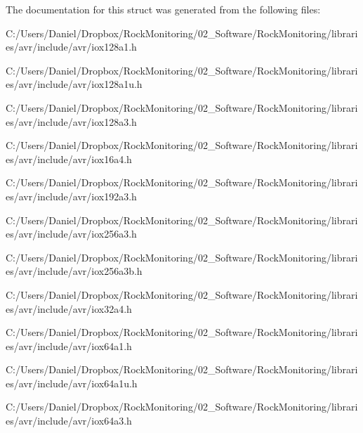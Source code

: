 The documentation for this struct was generated from the following files\+:\begin{DoxyCompactItemize}
\item 
C\+:/\+Users/\+Daniel/\+Dropbox/\+Rock\+Monitoring/02\+\_\+\+Software/\+Rock\+Monitoring/libraries/avr/include/avr/iox128a1.\+h\item 
C\+:/\+Users/\+Daniel/\+Dropbox/\+Rock\+Monitoring/02\+\_\+\+Software/\+Rock\+Monitoring/libraries/avr/include/avr/iox128a1u.\+h\item 
C\+:/\+Users/\+Daniel/\+Dropbox/\+Rock\+Monitoring/02\+\_\+\+Software/\+Rock\+Monitoring/libraries/avr/include/avr/iox128a3.\+h\item 
C\+:/\+Users/\+Daniel/\+Dropbox/\+Rock\+Monitoring/02\+\_\+\+Software/\+Rock\+Monitoring/libraries/avr/include/avr/iox16a4.\+h\item 
C\+:/\+Users/\+Daniel/\+Dropbox/\+Rock\+Monitoring/02\+\_\+\+Software/\+Rock\+Monitoring/libraries/avr/include/avr/iox192a3.\+h\item 
C\+:/\+Users/\+Daniel/\+Dropbox/\+Rock\+Monitoring/02\+\_\+\+Software/\+Rock\+Monitoring/libraries/avr/include/avr/iox256a3.\+h\item 
C\+:/\+Users/\+Daniel/\+Dropbox/\+Rock\+Monitoring/02\+\_\+\+Software/\+Rock\+Monitoring/libraries/avr/include/avr/iox256a3b.\+h\item 
C\+:/\+Users/\+Daniel/\+Dropbox/\+Rock\+Monitoring/02\+\_\+\+Software/\+Rock\+Monitoring/libraries/avr/include/avr/iox32a4.\+h\item 
C\+:/\+Users/\+Daniel/\+Dropbox/\+Rock\+Monitoring/02\+\_\+\+Software/\+Rock\+Monitoring/libraries/avr/include/avr/iox64a1.\+h\item 
C\+:/\+Users/\+Daniel/\+Dropbox/\+Rock\+Monitoring/02\+\_\+\+Software/\+Rock\+Monitoring/libraries/avr/include/avr/iox64a1u.\+h\item 
C\+:/\+Users/\+Daniel/\+Dropbox/\+Rock\+Monitoring/02\+\_\+\+Software/\+Rock\+Monitoring/libraries/avr/include/avr/iox64a3.\+h\end{DoxyCompactItemize}
